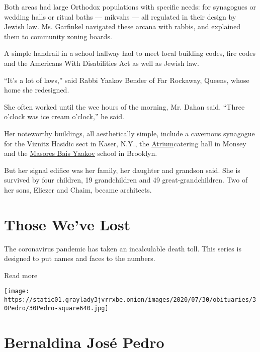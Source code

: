 Both areas had large Orthodox populations with specific needs: for
synagogues or wedding halls or ritual baths --- mikvahs --- all
regulated in their design by Jewish law. Ms. Garfinkel navigated these
arcana with rabbis, and explained them to community zoning boards.

A simple handrail in a school hallway had to meet local building codes,
fire codes and the Americans With Disabilities Act as well as Jewish
law.

``It's a lot of laws,'' said Rabbi Yaakov Bender of Far Rockaway,
Queens, whose home she redesigned.

She often worked until the wee hours of the morning, Mr. Dahan said.
``Three o'clock was ice cream o'clock,'' he said.

Her noteworthy buildings, all aesthetically simple, include a cavernous
synagogue for the Viznitz Hasidic sect in Kaser, N.Y., the
\href{https://www.theyeshivaworld.com/news/featured/1838568/alert-from-rockland-health-dept-atrium-wedding-hall-among-locations-exposed-to-coronavirus.html}{Atrium}catering
hall in Monsey and the
\href{https://insideschools.org/school/22KAHA}{Masores Bais Yaakov}
school in Brooklyn.

But her signal edifice was her family, her daughter and grandson said.
She is survived by four children, 19 grandchildren and 49
great-grandchildren. Two of her sons, Eliezer and Chaim, became
architects.

\href{https://www.nytimes3xbfgragh.onion/interactive/2020/obituaries/people-died-coronavirus-obituaries.html?action=click\&pgtype=Article\&state=default\&region=BELOW_MAIN_CONTENT\&context=covid_obits_promo}{}

\hypertarget{those-weve-lost}{%
\section{Those We've Lost}\label{those-weve-lost}}

The coronavirus pandemic has taken an incalculable death toll. This
series is designed to put names and faces to the numbers.

Read more

\texttt{[image: https://static01.graylady3jvrrxbe.onion/images/2020/07/30/obituaries/30Pedro/30Pedro-square640.jpg]}

\hypertarget{bernaldina-josuxe9-pedro}{%
\section{Bernaldina José Pedro}\label{bernaldina-josuxe9-pedro}}

